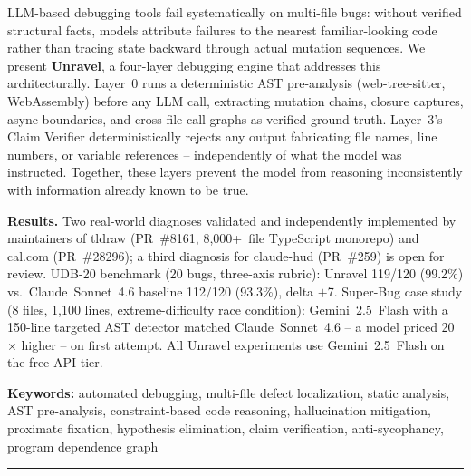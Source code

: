 \documentclass[12pt,a4paper]{article}
\begin{document}
\begin{tcolorbox}[enhanced, colback=white, colframe=rulecolor, boxrule=0.8pt,
  arc=5pt, left=14pt, right=14pt, top=10pt, bottom=10pt,
  title={\textbf{\small Abstract}}, attach boxed title to top left={xshift=12pt, yshift=-\tcboxedtitleheight/2},
  boxed title style={colback=white, colframe=rulecolor, arc=3pt}]

LLM-based debugging tools fail systematically on multi-file bugs: without verified
structural facts, models attribute failures to the nearest familiar-looking code rather
than tracing state backward through actual mutation sequences. We present
\textbf{Unravel}, a four-layer debugging engine that addresses this architecturally.
Layer~0 runs a deterministic AST pre-analysis (web-tree-sitter, WebAssembly) before any
LLM call, extracting mutation chains, closure captures, async boundaries, and cross-file
call graphs as verified ground truth. Layer~3's Claim Verifier deterministically rejects
any output fabricating file names, line numbers, or variable references -- independently
of what the model was instructed. Together, these layers prevent the model from reasoning
inconsistently with information already known to be true.

\textbf{Results.} Two real-world diagnoses validated and independently implemented
by maintainers of tldraw (PR~\#8161, 8,000+~file TypeScript monorepo) and cal.com
(PR~\#28296); a third diagnosis for claude-hud (PR~\#259) is open for review. UDB-20 benchmark (20 bugs,
three-axis rubric): Unravel 119/120 (99.2\%) vs.\ Claude~Sonnet~4.6 baseline 112/120
(93.3\%), delta $+$7. Super-Bug case study (8 files, 1,100 lines, extreme-difficulty
race condition): Gemini~2.5~Flash with a 150-line targeted AST detector matched
Claude~Sonnet~4.6 -- a model priced 20$\times$ higher -- on first attempt. All Unravel
experiments use Gemini~2.5~Flash on the free API tier.

\vspace{6pt}
\noindent\textbf{Keywords:} automated debugging, multi-file defect localization, static
analysis, AST pre-analysis, constraint-based code reasoning, hallucination mitigation,
proximate fixation, hypothesis elimination, claim verification, anti-sycophancy, program
dependence graph
\end{tcolorbox}

\vspace{10pt}
\noindent\textcolor{rulecolor}{\rule{\linewidth}{1pt}}
\end{document}

